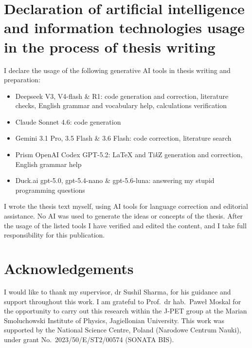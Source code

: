 \documentclass[12pt]{report}
\begin{document}
\clearpage
\thispagestyle{numberonly}

\section*{Declaration of artificial intelligence and information technologies usage in the process of thesis writing}

I declare the usage of the following generative AI tools in thesis writing and preparation:
\begin{itemize}
\item Deepseek V3, V4-flash \& R1: code generation and correction, literature checks, English grammar and vocabulary help, calculations verification
\item Claude Sonnet 4.6: code generation
\item Gemini 3.1 Pro, 3.5 Flash \& 3.6 Flash: code correction, literature search
\item Prism OpenAI Codex GPT-5.2: \LaTeX{} and Ti\emph{k}Z generation and correction, English grammar help
\item Duck.ai gpt-5.0, gpt-5.4-nano \& gpt-5.6-luna: answering my stupid programming questions
\end{itemize}

I wrote the thesis text myself, using AI tools for language correction and editorial assistance. No AI was used to generate the ideas or concepts of the thesis. After the usage of the listed tools I have verified and edited the content, and I take full responsibility for this publication.

\section*{Acknowledgements}

I would like to thank my supervisor, dr Sushil Sharma, for his guidance and support throughout this work. I am grateful to Prof.\ dr hab.\ Paweł Moskal for the opportunity to carry out this research within the J-PET group at the Marian Smoluchowski Institute of Physics, Jagiellonian University. This work was supported by the National Science Centre, Poland (Narodowe Centrum Nauki), under grant No.\ 2023/50/E/ST2/00574 (SONATA BIS).


\printbibliography[heading=bibintoc]
\end{document}
